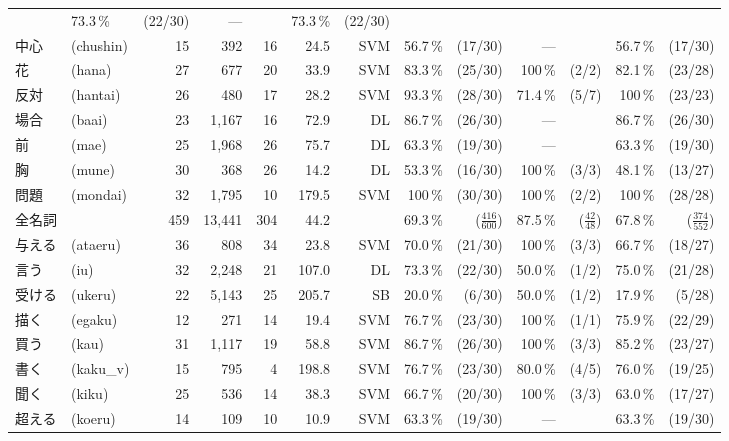 \begin{table*}[htbp]
\begin{center}
\begin{tabular}[c]{|l@{}l@{ }|@{ }r@{ }|@{ }r@{ }|@{ }r@{ }|@{ }r@{ }|@{ }r@{ }|r@{ }r@{ }|r@{}r@{ }|r@{ }r@{ }|}
      & 73.3\,\% & (22/30) & --- & & 73.3\,\% & (22/30) \\
      中心 & (chushin) & 15 & 392 & 16 & 24.5 & SVM 
      & 56.7\,\% & (17/30) & --- & & 56.7\,\% & (17/30) \\
      花 & (hana) & 27 & 677 & 20 & 33.9 & SVM 
      & 83.3\,\% & (25/30) & 100\,\% & (2/2) & 82.1\,\% & (23/28) \\
      反対 & (hantai) & 26 & 480 & 17 & 28.2 & SVM 
      & 93.3\,\% & (28/30) & 71.4\,\% & (5/7) & 100\,\% & (23/23) \\
      場合 & (baai) & 23 & 1,167 & 16 & 72.9 & DL 
      & 86.7\,\% & (26/30) & --- & & 86.7\,\% & (26/30) \\
      前 & (mae) & 25 & 1,968 & 26 & 75.7 & DL 
      & 63.3\,\% & (19/30) & --- & & 63.3\,\% & (19/30) \\
      胸 & (mune) & 30 & 368 & 26 & 14.2 & DL 
      & 53.3\,\% & (16/30) & 100\,\% & (3/3) & 48.1\,\% & (13/27) \\
      問題 & (mondai) & 32 & 1,795 & 10 & 179.5 & SVM 
      & 100\,\% & (30/30) & 100\,\% & (2/2) & 100\,\% & (28/28) \\
      \hline
      全名詞 & & 459 & 13,441 & 304 & 44.2 & 
      & 69.3\,\% & ($\frac{416}{600}$) 
      & 87.5\,\% & ($\frac{42}{48}$) & 67.8\,\% & ($\frac{374}{552}$) \\
      \hline
      与える & (ataeru) & 36 & 808 & 34 & 23.8 & SVM 
      & 70.0\,\% & (21/30) & 100\,\% & (3/3) & 66.7\,\% & (18/27)\\
      言う & (iu) & 32 & 2,248 & 21 & 107.0 & DL 
      & 73.3\,\% & (22/30) & 50.0\,\% & (1/2) & 75.0\,\% & (21/28) \\
      受ける & (ukeru) & 22 & 5,143 & 25 & 205.7 & SB 
      & 20.0\,\% & (6/30) & 50.0\,\% & (1/2) & 17.9\,\% & (5/28) \\
      描く & (egaku) & 12 & 271 & 14 & 19.4 & SVM 
      & 76.7\,\% & (23/30) & 100\,\% & (1/1) & 75.9\,\% & (22/29) \\
      買う & (kau) & 31 & 1,117 & 19 & 58.8 & SVM 
      & 86.7\,\% & (26/30) & 100\,\% & (3/3) & 85.2\,\% & (23/27) \\
      書く & (kaku\_v) & 15 & 795 & 4 & 198.8 & SVM 
      & 76.7\,\% & (23/30) & 80.0\,\% & (4/5) & 76.0\,\% & (19/25) \\
      聞く & (kiku) & 25 & 536 & 14 & 38.3 & SVM 
      & 66.7\,\% & (20/30) & 100\,\% & (3/3) & 63.0\,\% & (17/27) \\
      超える & (koeru) & 14 & 109 & 10 & 10.9 & SVM 
      & 63.3\,\% & (19/30) & --- & & 63.3\,\% & (19/30) \\

\end{tabular}
\end{center}
\end{table*}
